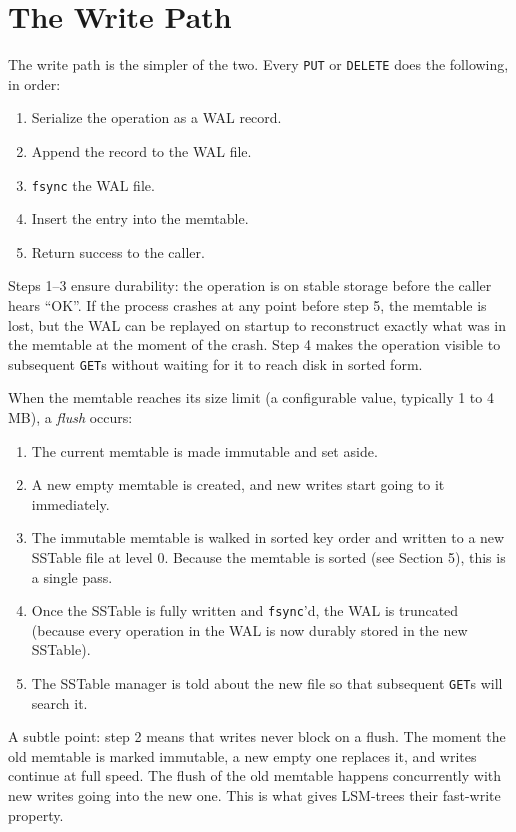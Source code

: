 \documentclass[11pt,a4paper]{article}
\begin{document}
\section{The Write Path}

The write path is the simpler of the two. Every \texttt{PUT} or \texttt{DELETE} does the following, in order:

\begin{enumerate}
\item Serialize the operation as a WAL record.
\item Append the record to the WAL file.
\item \texttt{fsync} the WAL file.
\item Insert the entry into the memtable.
\item Return success to the caller.
\end{enumerate}

Steps 1--3 ensure durability: the operation is on stable storage before the caller hears ``OK''. If the process crashes at any point before step 5, the memtable is lost, but the WAL can be replayed on startup to reconstruct exactly what was in the memtable at the moment of the crash. Step 4 makes the operation visible to subsequent \texttt{GET}s without waiting for it to reach disk in sorted form.

When the memtable reaches its size limit (a configurable value, typically 1 to 4 MB), a \textit{flush} occurs:

\begin{enumerate}
\item The current memtable is made immutable and set aside.
\item A new empty memtable is created, and new writes start going to it immediately.
\item The immutable memtable is walked in sorted key order and written to a new SSTable file at level 0. Because the memtable is sorted (see Section 5), this is a single pass.
\item Once the SSTable is fully written and \texttt{fsync}'d, the WAL is truncated (because every operation in the WAL is now durably stored in the new SSTable).
\item The SSTable manager is told about the new file so that subsequent \texttt{GET}s will search it.
\end{enumerate}

A subtle point: step 2 means that writes never block on a flush. The moment the old memtable is marked immutable, a new empty one replaces it, and writes continue at full speed. The flush of the old memtable happens concurrently with new writes going into the new one. This is what gives LSM-trees their fast-write property.
\end{document}
